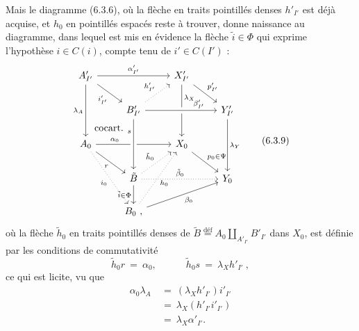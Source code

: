 Mais le diagramme (6.3.6), où la flèche en traits pointillés denses $h'_{I'}$ est déjà acquise, et $h_0$ en pointillés espacés reste à trouver, donne naissance au diagramme, dans lequel est mis en évidence la flèche $\tilde{i} \in \Phi$ qui exprime l'hypothèse $i \in C(i)$, %
compte tenu de $i' \in C(I')$ :
\[
\begin{tikzcd}
A'_{I'} \arrow[rr, "\alpha'_{I'}"] \arrow[dr, "i'_{I'}"'] \arrow[dd, "\lambda_A"'] & & X'_{I'} \arrow[dr, "p'_{I'}"] \arrow[dd, "\lambda_X" near start] & \\
 & B'_{I'} \arrow[ur, dotted, "h'_{I'}"] \arrow[rr, crossing over, "\beta'_{I'}" near end] & & Y'_{I'} \arrow[dd, "\lambda_Y"] \\
A_0 \arrow[ur, phantom, "\text{cocart.}"] \arrow[rr, "\alpha_0" near start] \arrow[dr, "r"'] \arrow[ddr, dotted, "i_0"'] & & X_0 \arrow[dr, "p_0\in\Psi"] & \\
 & \tilde{B} \arrow[from=2-2, crossing over, "s"' near start] \arrow[ur, dotted, "\tilde{h}_0"] \arrow[rr, dotted, "\tilde{\beta}_0"] \arrow[d, "\tilde{i}\in\Phi"'] & & Y_0 \\
 & B_0\ , \arrow[uur, dotted, "h_0"'] \arrow[urr, "\beta_0"'] & &
\end{tikzcd}
\tag*{(6.3.9)}
\]
où la flèche $\tilde{h}_0$ en traits pointillés denses de $\tilde{B} \overset{\text{déf}}{=} A_0 \amalg_{A'_{I'}} B'_{I'}$ dans $X_0$, est définie par les conditions de commutativité
\[
\tilde{h}_0r \ =\ \alpha_0, \qquad\quad \tilde{h}_0s \ =\ \lambda_X h'_{I'}\ ,
\tag*{(6.3.10)}
\]
ce qui est licite, vu que
\[
\begin{aligned}
\alpha_0\lambda_A \ &=\ (\lambda_X h'_{I'})i'_{I'} \\
&=\ \lambda_X(h'_{I'}i'_{I'}) \\
&=\ \lambda_X\alpha'_{I'}.
\end{aligned}
\]

